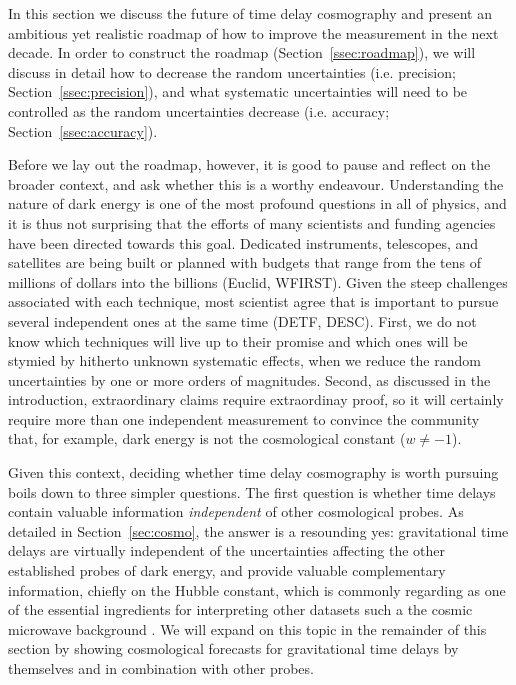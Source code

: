 


In this section we discuss the future of time delay cosmography and
present an ambitious yet realistic roadmap of how to improve the
measurement in the next decade. In order to construct the roadmap
(Section~\ref{ssec:roadmap}), we will discuss in detail how to
decrease the random uncertainties (i.e. precision;
Section~\ref{ssec:precision}), and what systematic uncertainties will
need to be controlled as the random uncertainties decrease
(i.e. accuracy; Section~\ref{ssec:accuracy}).

Before we lay out the roadmap, however, it is good to pause and
reflect on the broader context, and ask whether this is a worthy
endeavour.  Understanding the nature of dark energy is one of the most
profound questions in all of physics, and it is thus not surprising
that the efforts of many scientists and funding agencies have been
directed towards this goal. Dedicated instruments, telescopes, and
satellites are being built or planned with budgets that range from the
tens of millions of dollars into the billions (Euclid, WFIRST). Given
the steep challenges associated with each technique, most scientist
agree that is important to pursue several independent ones at the same
time (DETF, DESC). First, we do not know which techniques will live up
to their promise and which ones will be stymied by hitherto unknown
systematic effects, when we reduce the random uncertainties by one or
more orders of magnitudes. Second, as discussed in the introduction,
extraordinary claims require extraordinay proof, so it will certainly
require more than one independent measurement to convince the
community that, for example, dark energy is not the cosmological
constant ($w\neq-1$).

Given this context, deciding whether time delay cosmography is worth
pursuing boils down to three simpler questions. The first question is
whether time delays contain valuable information {\it independent} of
other cosmological probes. As detailed in Section~\ref{sec:cosmo}, the
answer is a resounding yes: gravitational time delays are virtually
independent of the uncertainties affecting the other established
probes of dark energy, and provide valuable complementary information,
chiefly on the Hubble constant, which is commonly regarding as one of
the essential ingredients for interpreting other datasets such a the
cosmic microwave background \citep{Hu05,Suy++12,Wei++13}.  We will
expand on this topic in the remainder of this section by showing
cosmological forecasts for gravitational time delays by themselves and
in combination with other probes.

